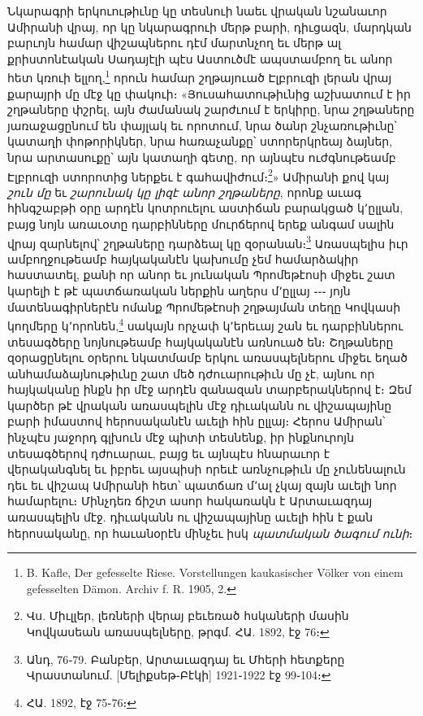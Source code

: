 \documentclass{article}
\begin{document}
{Նկարագրի երկուութիւնը կը տեսնուի նաեւ վրական նշանաւոր Ամիրանի վրայ, որ կը նկարագրուի մերթ բարի, դիւցազն, մարդկան բարւոյն համար վիշապներու դէմ մարտնչող եւ մերթ ալ քրիստոնէական Սադայէլի պէս Աստուծմէ ապստամբող եւ անոր հետ կռուի ելլող,\footnote{B. Kafle, Der gefesselte Riese. Vorstellungen kaukasischer Völker von einem gefesselten Dämon. Archiv f. R. 1905, 2.} որուն համար շղթայուած Էլբրուզի լերան վրայ քարայրի մը մէջ կը փակուի։ «Յուսահատութիւնից աշխատում է իր շղթաները փշրել, այն ժամանակ շարժւում է երկիրը, նրա շղթաները յառաջացընում են փայլակ եւ որոտում, նրա ծանր շնչառութիւնը՝ կատաղի փոթորիկներ, նրա հառաչանքը՝ ստորերկրեայ ձայներ, նրա արտասուքը՝ այն կատաղի գետը, որ այնպէս ուժգնութեամբ Էլբրուզի ստորոտից ներքեւ է գահավիժում։\footnote{Վս. Միւլլեր, լեռների վերայ բեւեռած հսկաների մասին Կովկասեան առասպելները, թրգմ. ՀԱ. 1892, էջ 76։}» Ամիրանի քով կայ \emph{շուն մը} եւ \emph{շարունակ կը լիզէ անոր շղթաները}, որոնք աւագ հինգշաբթի օրը արդէն կոտրուելու աստիճան բարակցած կ՚ըլլան, բայց նոյն առաւօտը դարբինները մուրճերով երեք անգամ սալին վրայ զարնելով՝ շղթաները դարձեալ կը զօրանան։\footnote{Անդ, 76֊79. Բանբեր, Արտաւազդայ եւ Մհերի հետքերը Վրաստանում. [Մելիքսեթ֊Բէկի] 1921֊1922 էջ 99֊104։} Առասպելիս իւր ամբողջութեամբ հայկականէն կախումը չեմ համարձակիր հաստատել, քանի որ անոր եւ յունական Պրոմեթէոսի միջեւ շատ կարելի է թէ պատճառական ներքին աղերս մ՚ըլլայ ֊֊֊ յոյն մատենագիրներէն ոմանք Պրոմեթէոսի շղթայման տեղը Կովկասի կողմերը կ՚որոնեն,\footnote{ՀԱ. 1892, էջ 75֊76։} սակայն որչափ կ՚երեւայ շան եւ դարբիններու տեսագծերը նոյնութեամբ հայկականէն առնուած են։ Շղթաները զօրացընելու օրերու նկատմամբ երկու առասպելներու միջեւ եղած անհամաձայնութիւնը շատ մեծ դժուարութիւն մը չէ, այնու որ հայկականը ինքն իր մէջ արդէն զանազան տարբերակներով է։ Զեմ կարծեր թէ վրական առասպելին մէջ դիւականն ու վիշապայինը բարի իմաստով հերոսականէն աւելի հին ըլլայ։ Հերոս Ամիրան՝ ինչպէս յաջորդ գլխուն մէջ պիտի տեսնենք, իր ինքնուրոյն տեսագծերով դժուարաւ, բայց եւ այնպէս հնարաւոր է վերականգնել եւ իբրեւ այսպիսի որեւէ առնչութիւն մը չունենալուն դեւ եւ վիշապ Ամիրանի հետ՝ պատճառ մ՚ալ չկայ զայն աւելի նոր համարելու։ Մինչդեռ ճիշտ ասոր հակառակն է Արտաւազդայ առասպելին մէջ. դիւականն ու վիշապայինը աւելի հին է քան հերոսականը, որ հաւանօրէն մինչեւ իսկ \emph{պատմական ծագում ունի}։

}
\end{document}
